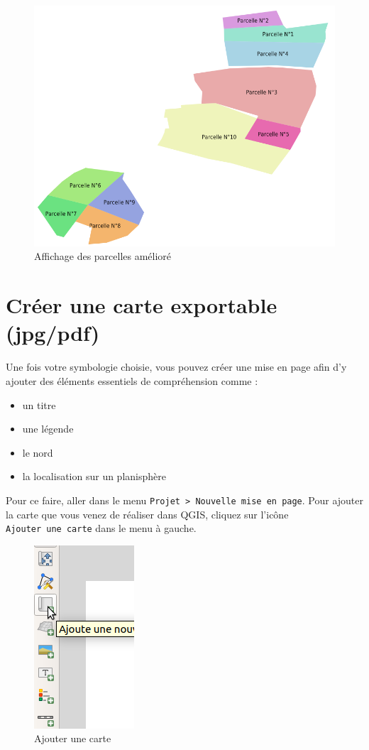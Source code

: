 \begin{figure}[htbp]
\centering
\includegraphics{figures/parcelle_style.png}
\caption{Affichage des parcelles amélioré}
\end{figure}

\section{Créer une carte exportable
(jpg/pdf)}\label{cruxe9er-une-carte-exportable-jpgpdf}

Une fois votre symbologie choisie, vous pouvez créer une mise en page
afin d'y ajouter des éléments essentiels de compréhension comme :

\begin{itemize}
\tightlist
\item
  un titre
\item
  une légende
\item
  le nord
\item
  la localisation sur un planisphère
\end{itemize}

Pour ce faire, aller dans le menu
\texttt{Projet\ \textgreater{}\ Nouvelle\ mise\ en\ page}. Pour ajouter
la carte que vous venez de réaliser dans QGIS, cliquez sur l'icône
\texttt{Ajouter\ une\ carte} dans le menu à gauche.

\begin{figure}[htbp]
\centering
\includegraphics{figures/composer_addMap.png}
\caption{Ajouter une carte}
\end{figure}

